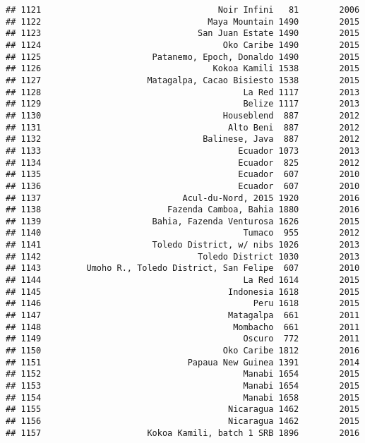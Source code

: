 \documentclass[
]{article}
\begin{document}
\begin{verbatim}
## 1121                                   Noir Infini   81        2006
## 1122                                 Maya Mountain 1490        2015
## 1123                               San Juan Estate 1490        2015
## 1124                                    Oko Caribe 1490        2015
## 1125                      Patanemo, Epoch, Donaldo 1490        2015
## 1126                                  Kokoa Kamili 1538        2015
## 1127                     Matagalpa, Cacao Bisiesto 1538        2015
## 1128                                        La Red 1117        2013
## 1129                                        Belize 1117        2013
## 1130                                    Houseblend  887        2012
## 1131                                     Alto Beni  887        2012
## 1132                                Balinese, Java  887        2012
## 1133                                       Ecuador 1073        2013
## 1134                                       Ecuador  825        2012
## 1135                                       Ecuador  607        2010
## 1136                                       Ecuador  607        2010
## 1137                            Acul-du-Nord, 2015 1920        2016
## 1138                         Fazenda Camboa, Bahia 1880        2016
## 1139                      Bahia, Fazenda Venturosa 1626        2015
## 1140                                        Tumaco  955        2012
## 1141                      Toledo District, w/ nibs 1026        2013
## 1142                               Toledo District 1030        2013
## 1143         Umoho R., Toledo District, San Felipe  607        2010
## 1144                                        La Red 1614        2015
## 1145                                     Indonesia 1618        2015
## 1146                                          Peru 1618        2015
## 1147                                     Matagalpa  661        2011
## 1148                                      Mombacho  661        2011
## 1149                                        Oscuro  772        2011
## 1150                                    Oko Caribe 1812        2016
## 1151                             Papaua New Guinea 1391        2014
## 1152                                        Manabi 1654        2015
## 1153                                        Manabi 1654        2015
## 1154                                        Manabi 1658        2015
## 1155                                     Nicaragua 1462        2015
## 1156                                     Nicaragua 1462        2015
## 1157                     Kokoa Kamili, batch 1 SRB 1896        2016

\end{verbatim}
\end{document}
